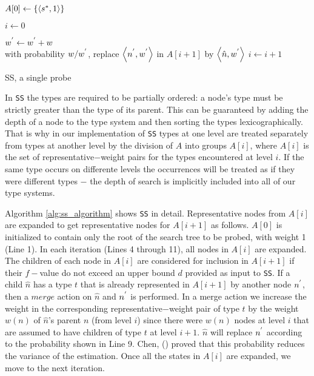 \begin{algorithm}

$A[0] \leftarrow \{\left\langle  s\sp{*},1 \right\rangle \}$

$i \leftarrow 0$

 {
	 {
		 {
			 {
				 {
				$w\sp{'} \leftarrow w\sp{'} + w$\\ 
				with probability $w/w\sp{'}$, replace $\left\langle n\sp{'}, w\sp{'} \right\rangle$ in $A[i+1]$ by $\left\langle \hat{n},w\sp{'} \right\rangle$
				} 
			}
		}
	}
	$i \leftarrow i + 1$
}
\caption{SS, a single probe}
\label{alg:ss_algorithm}
\end{algorithm}

In \texttt{SS} the types are required to be partially ordered: a node's type must be strictly greater than the type of its parent. This can be guaranteed by adding the depth of a node to the type system and then sorting the types lexicographically. That is why in our implementation of \texttt{SS} types at one level are treated separately from types at another level by the division of $A$ into groups $A[i]$, where $A[i]$ is the set of representative$-$weight pairs for the types encountered at level $i$. If the same type occurs on differente levels the occurrences will be treated as if they were different types $-$ the depth of search is implicitly included into all of our type systems.

Algorithm \ref{alg:ss_algorithm} shows \texttt{SS} in detail. Representative nodes from $A[i]$ are expanded to get representative nodes for $A[i+1]$ as follows. $A[0]$ is initialized to contain only the root of the search tree to be probed, with weight 1 (Line 1). In each iteration (Lines 4 through 11), all nodes in $A[i]$ are expanded. The children of each node in $A[i]$ are considered for inclusion in $A[i+1]$ if their $f-$value do not exceed an upper bound $d$ provided as input to \texttt{SS}. If a child $\hat{n}$ has a type $t$ that is already represented in $A[i+1]$ by another node $n\sp{'}$, then a $merge$ action on $\hat{n}$ and $n\sp{'}$ is performed. In a merge action we increase the weight in the corresponding representative$-$weight pair of type $t$ by the weight $w(n)$ of $\hat{n}$'s parent $n$ (from level $i$) since there were $w(n)$ nodes at level $i$ that are assumed to have children of type $t$ at level $i+1$. $\hat{n}$ will replace $n\sp{'}$ according to the probability shown in Line 9. Chen, (\citeyear{chen1992heuristic}) proved that this probability reduces the variance of the estimation. Once all the states in $A[i]$ are expanded, we move to the next iteration.

